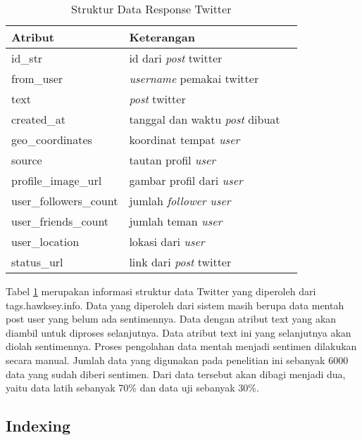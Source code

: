 \begin{table}[hbt]
	\caption{Struktur Data Response Twitter}
	\centering
	\begin{tabular}{llr}
		
		\cmidrule(r){1-2}
		Atribut & Keterangan \\
		\midrule
		id\_str & id dari \textit{post} twitter \\
		from\_user & \textit{username} pemakai twitter \\
		text & \textit{post} twitter \\
		created\_at & tanggal dan waktu \textit{post} dibuat \\
		geo\_coordinates & koordinat tempat \textit{user} \\
		source & tautan profil \textit{user} \\
		profile\_image\_url & gambar profil dari \textit{user} \\
		user\_followers\_count & jumlah \textit{follower user} \\
		user\_friends\_count & jumlah teman \textit{user} \\
		user\_location & lokasi dari \textit{user} \\
		status\_url & link dari \textit{post} twitter \\
		
		\bottomrule
	\end{tabular}
	\label{tab:strukturdatatwitter}
\end{table}

Tabel \ref{tab:strukturdatatwitter} merupakan informasi struktur data Twitter yang diperoleh dari tags.hawksey.info. Data yang diperoleh dari sistem masih berupa data mentah post user yang belum ada sentimennya. Data dengan atribut text yang akan diambil untuk diproses selanjutnya. Data atribut text ini yang selanjutnya akan diolah sentimennya. Proses pengolahan data mentah menjadi sentimen dilakukan secara manual. Jumlah data yang digunakan pada penelitian ini sebanyak 6000 data yang sudah diberi sentimen. Dari data tersebut akan dibagi menjadi dua, yaitu data latih sebanyak 70\% dan data uji sebanyak 30\%. 


\subsection*{Indexing}

